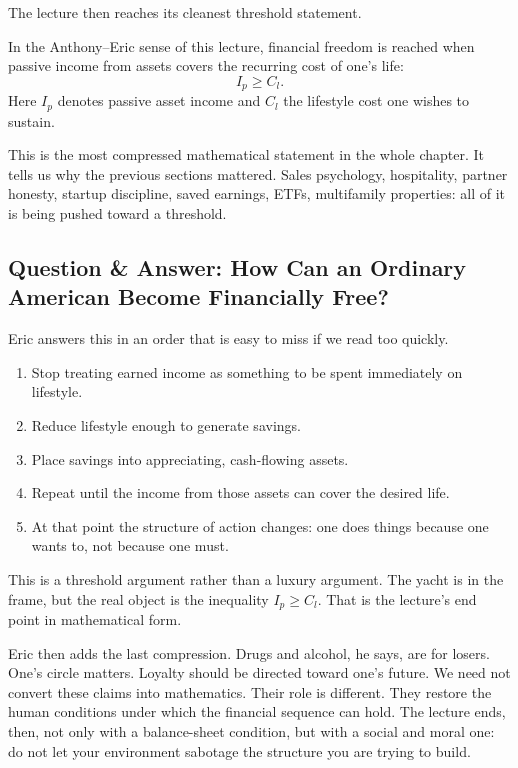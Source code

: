 The lecture then reaches its cleanest threshold statement.

\begin{definition}
In the Anthony--Eric sense of this lecture, financial freedom is reached when passive income from assets covers the recurring cost of one's life:
\begin{equation}
I_p \ge C_l.
\end{equation}
Here \(I_p\) denotes passive asset income and \(C_l\) the lifestyle cost one wishes to sustain.
\end{definition}

This is the most compressed mathematical statement in the whole chapter. It tells us why the previous sections mattered. Sales psychology, hospitality, partner honesty, startup discipline, saved earnings, ETFs, multifamily properties: all of it is being pushed toward a threshold.

\subsection{Question \& Answer: How Can an Ordinary American Become Financially Free?}

Eric answers this in an order that is easy to miss if we read too quickly.

\begin{enumerate}
\item Stop treating earned income as something to be spent immediately on lifestyle.
\item Reduce lifestyle enough to generate savings.
\item Place savings into appreciating, cash-flowing assets.
\item Repeat until the income from those assets can cover the desired life.
\item At that point the structure of action changes: one does things because one wants to, not because one must.
\end{enumerate}

This is a threshold argument rather than a luxury argument. The yacht is in the frame, but the real object is the inequality \(I_p \ge C_l\). That is the lecture's end point in mathematical form.

Eric then adds the last compression. Drugs and alcohol, he says, are for losers. One's circle matters. Loyalty should be directed toward one's future. We need not convert these claims into mathematics. Their role is different. They restore the human conditions under which the financial sequence can hold. The lecture ends, then, not only with a balance-sheet condition, but with a social and moral one: do not let your environment sabotage the structure you are trying to build.

